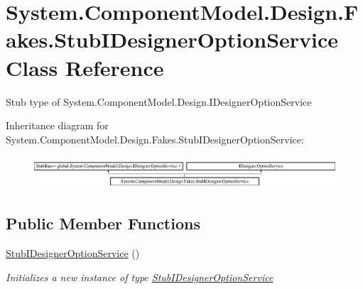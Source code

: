 \hypertarget{class_system_1_1_component_model_1_1_design_1_1_fakes_1_1_stub_i_designer_option_service}{\section{System.\-Component\-Model.\-Design.\-Fakes.\-Stub\-I\-Designer\-Option\-Service Class Reference}
\label{class_system_1_1_component_model_1_1_design_1_1_fakes_1_1_stub_i_designer_option_service}
}


Stub type of System.\-Component\-Model.\-Design.\-I\-Designer\-Option\-Service 


Inheritance diagram for System.\-Component\-Model.\-Design.\-Fakes.\-Stub\-I\-Designer\-Option\-Service\-:\begin{figure}[H]
\begin{center}
\leavevmode
\includegraphics[height=1.220044cm]{class_system_1_1_component_model_1_1_design_1_1_fakes_1_1_stub_i_designer_option_service}
\end{center}
\end{figure}
\subsection*{Public Member Functions}
\begin{DoxyCompactItemize}
\item 
\hyperlink{class_system_1_1_component_model_1_1_design_1_1_fakes_1_1_stub_i_designer_option_service_ab2590b059d9873d88d543167c18410ed}{Stub\-I\-Designer\-Option\-Service} ()
\begin{DoxyCompactList}\small\item\em Initializes a new instance of type \hyperlink{class_system_1_1_component_model_1_1_design_1_1_fakes_1_1_stub_i_designer_option_service}{Stub\-I\-Designer\-Option\-Service}\end{DoxyCompactList}\end{DoxyCompactItemize}
